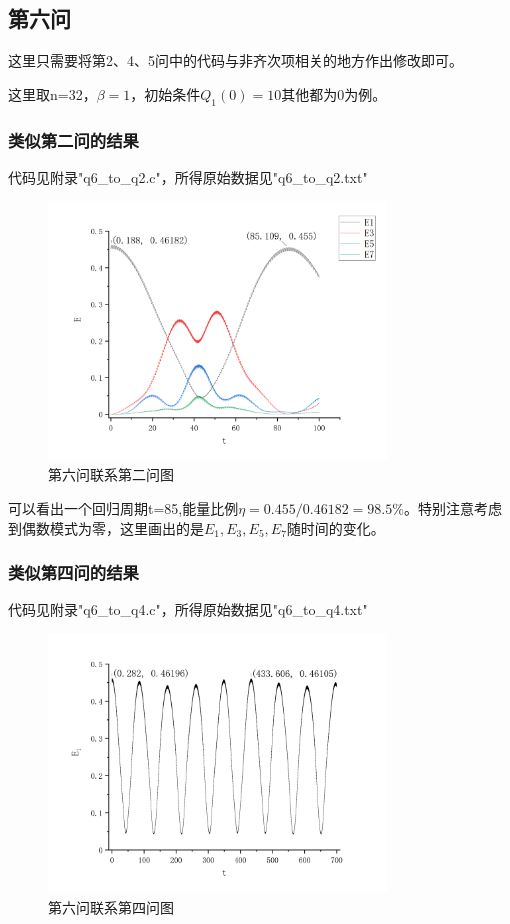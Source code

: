 \documentclass[10pt, a4paper]{article}
\begin{document}
    \subsection{第六问}

    这里只需要将第2、4、5问中的代码与非齐次项相关的地方作出修改即可。

    这里取n=32，$\beta=1$，初始条件$Q_1(0)=10$其他都为0为例。

    \subsubsection{类似第二问的结果}

    代码见附录"q6_to_q2.c"，所得原始数据见"q6_to_q2.txt"
    \begin{figure}[H]
        \centering
        \includegraphics[width=0.8\textwidth]{第六问联系第二问图.jpg}
        \caption{第六问联系第二问图}\label{fig:第六问联系第二问图}
    \end{figure}

    可以看出一个回归周期t=85,能量比例$\eta=0.455/0.46182=98.5\%$。特别注意考虑到偶数模式为零，这里画出的是$E_1,E_3,E_5,E_7$随时间的变化。

    \subsubsection{类似第四问的结果}

    代码见附录"q6_to_q4.c"，所得原始数据见"q6_to_q4.txt"
    \begin{figure}[H]
        \centering
        \includegraphics[width=0.8\textwidth]{第六问联系第四问图.jpg}
        \caption{第六问联系第四问图}\label{fig:第六问联系第四问图}
    \end{figure}
\end{document}
